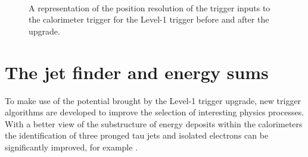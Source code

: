 \begin{figure}
  \centering
  ~ 
   \\
  \caption{A representation of the position resolution of the trigger
  inputs to the calorimeter trigger for the Level-1 trigger before and
  after the upgrade.}
  \label{fig:sunnyJim}
\end{figure}

\section{The jet finder and energy sums}
\label{sec:jetFinder}

To make use of the potential brought by the Level-1 trigger upgrade,
new trigger algorithms are developed to improve the selection of
interesting physics processes. With a better view of the substructure
of energy deposits within the calorimeters the identification of three
pronged tau jets and isolated electrons can be significantly improved,
for example \cite{egllr,taullr}. 

